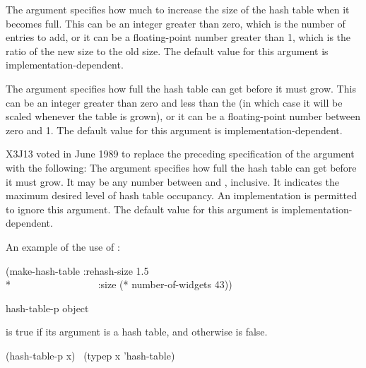 \begin{defun}[Function]
The  argument
specifies how much to increase the size of the hash table when it becomes
full.  This can be an integer greater than zero,
which is the number of entries to add, or
it can be a floating-point number greater than 1,
which is the ratio of the new size to the old size.
The default value for this argument is implementation-dependent.

\begin{obsolete}
The  argument
specifies how full the hash table can get before it must grow.
This can be an integer greater than zero and less than the 
(in which case it will be scaled whenever the table is grown),
or it can be a floating-point number between zero and 1.
The default value for this argument is implementation-dependent.
\end{obsolete}

\begin{newer}
X3J13 voted in June 1989  to replace
the preceding specification of the  argument
with the following:
The  argument
specifies how full the hash table can get before it must grow.
It may be any  number between  and , inclusive.
It indicates the maximum desired level of hash table occupancy.
An implementation is permitted to ignore this argument.
The default value for this argument is implementation-dependent.
\end{newer}

An example of the use of :
\begin{lisp}
(make-hash-table :rehash-size 1.5 \\*
~~~~~~~~~~~~~~~~~:size (* number-of-widgets 43))
\end{lisp}
\end{defun}

\begin{defun}[Function]
hash-table-p object

 is true if its argument is a hash table,
and otherwise is false.
\begin{lisp}
(hash-table-p x) \EQ\ (typep x 'hash-table)
\end{lisp}
\end{defun}

